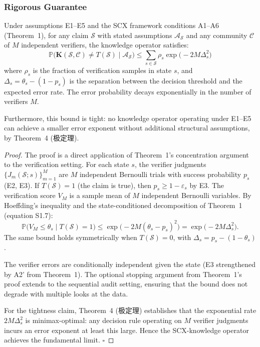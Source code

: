 \subsubsection{Rigorous Guarantee}
\label{sec:epistemic-guarantee}

\begin{theorem}
\label{thm:epistemic-rigorous}
Under assumptions E1--E5 and the SCX framework conditions A1--A6
(Theorem~1), for any claim $\mathcal{S}$ with stated assumptions
$\mathcal{A}_{\mathcal{S}}$ and any community $\mathcal{C}$ of $M$
independent verifiers, the knowledge operator satisfies:
\[
\boxed{\mathbb{P}\bigl(\mathbf{K}(\mathcal{S},\mathcal{C}) \neq T(\mathcal{S})
  \mid \mathcal{A}_{\mathcal{S}}\bigr)
  \leq \sum_{s\in\mathcal{S}} \rho_s \exp\bigl(-2M\Delta_s^2\bigr)}
\]
where $\rho_s$ is the fraction of verification samples in state $s$,
and $\Delta_s = \theta_s - (1-p_s)$ is the separation between the
decision threshold and the expected error rate. The error probability
decays exponentially in the number of verifiers $M$.

Furthermore, this bound is tight: no knowledge operator operating under
E1--E5 can achieve a smaller error exponent without additional structural
assumptions, by Theorem~4 (极定理).
\end{theorem}

\begin{proof}
The proof is a direct application of Theorem~1's concentration argument
to the verification setting. For each state $s$, the verifier judgments
$\{J_m(\mathcal{S}; s)\}_{m=1}^M$ are $M$ independent Bernoulli trials
with success probability $p_s$ (E2, E3). If $T(\mathcal{S})=1$ (the claim
is true), then $p_s \geq 1-\varepsilon_s$ by E3. The verification score
$V_M$ is a sample mean of $M$ independent Bernoulli variables.
By Hoeffding's inequality and the state-conditioned decomposition of
Theorem~1 (equation S1.7):
\[
\mathbb{P}\bigl(V_M \leq \theta_s \mid T(\mathcal{S})=1\bigr)
  \leq \exp\bigl(-2M(\theta_s - p_s)^2\bigr)
  = \exp\bigl(-2M\Delta_s^2\bigr).
\]
The same bound holds symmetrically when $T(\mathcal{S})=0$, with
$\Delta_s = p_s - (1-\theta_s)$.

The verifier errors are conditionally independent given the state (E3
strengthened by A2' from Theorem~1). The optional stopping argument from
Theorem~1's proof extends to the sequential audit setting, ensuring that
the bound does not degrade with multiple looks at the data.

For the tightness claim, Theorem~4 (极定理) establishes that the
exponential rate $2M\Delta_s^2$ is minimax-optimal: any decision rule
operating on $M$ verifier judgments incurs an error exponent at least
this large. Hence the SCX-knowledge operator achieves the fundamental
limit. $\square$
\end{proof}


